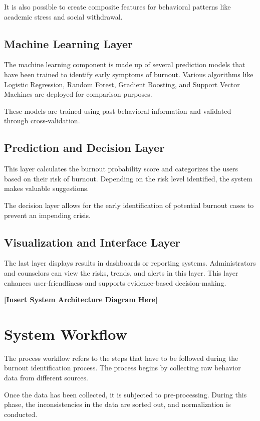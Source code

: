 It is also possible to create composite features for behavioral patterns like academic stress and social withdrawal.

\subsection{Machine Learning Layer}

The machine learning component is made up of several prediction models that have been trained to identify early symptoms of burnout. Various algorithms like Logistic Regression, Random Forest, Gradient Boosting, and Support Vector Machines are deployed for comparison purposes.

These models are trained using past behavioral information and validated through cross-validation.

\subsection{Prediction and Decision Layer}

This layer calculates the burnout probability score and categorizes the users based on their risk of burnout. Depending on the risk level identified, the system makes valuable suggestions.

The decision layer allows for the early identification of potential burnout cases to prevent an impending crisis.

\subsection{Visualization and Interface Layer}

The last layer displays results in dashboards or reporting systems. Administrators and counselors can view the risks, trends, and alerts in this layer.
This layer enhances user-friendliness and supports evidence-based decision-making.

\textbf{[Insert System Architecture Diagram Here]}


\section{System Workflow}

The process workflow refers to the steps that have to be followed during the burnout identification process. The process begins by collecting raw behavior data from different sources.

Once the data has been collected, it is subjected to pre-processing. During this phase, the inconsistencies in the data are sorted out, and normalization is conducted.

